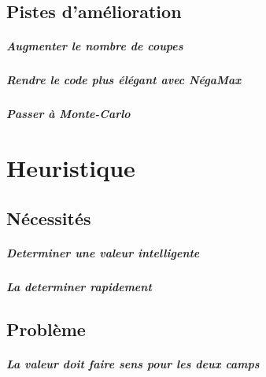 \documentclass{scrreprt}
\begin{document}
    \section{Pistes d'amélioration}

    \paragraph{Augmenter le nombre de coupes}

    \paragraph{Rendre le code plus élégant avec NégaMax}

    \paragraph{Passer à Monte-Carlo}

    \chapter{Heuristique}

    \section{Nécessités}

    \paragraph{Determiner une valeur intelligente}

    \paragraph{La determiner rapidement}

    \section{Problème}

    \paragraph{La valeur doit faire sens pour les deux camps}

    \begin{problem}

    \end{problem}
\end{document}
